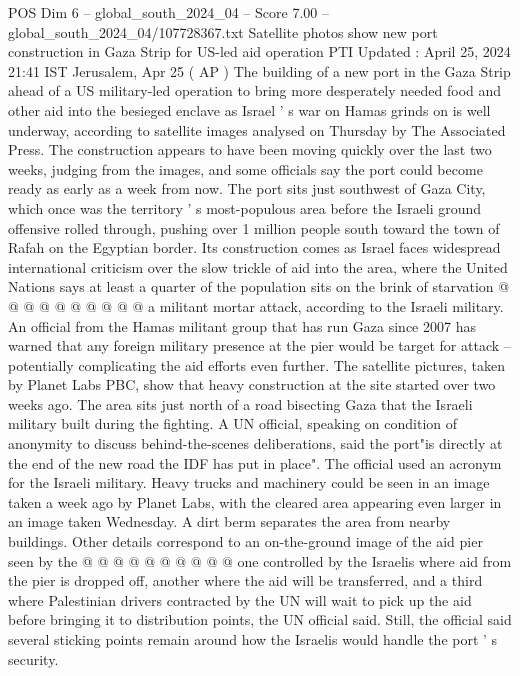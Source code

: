 \begin{textsample}{POS Dim 6 – global\_south\_2024\_04 – Score 7.00 – global\_south\_2024\_04/107728367.txt}  \label{ex:f6_pos_126}
Satellite photos show new port construction in Gaza Strip for US-led aid operation PTI Updated : April 25, 2024 21:41 IST Jerusalem, Apr 25 ( AP ) The building of a new port in the Gaza Strip ahead of a US military-led operation to bring more desperately needed food and other aid into the besieged enclave as Israel ' s war on Hamas grinds on is well underway, according to satellite images analysed on Thursday by The Associated Press.
The construction appears to have been moving quickly over the last two weeks, judging from the images, and some officials say the port could become ready as early as a week from now.
The port sits just southwest of Gaza City, which once was the territory ' s most-populous area before the Israeli ground offensive rolled through, pushing over 1 million people south toward the town of Rafah on the Egyptian border.
Its construction comes as Israel faces widespread international criticism over the slow trickle of aid into the area, where the United Nations says at least a quarter of the population sits on the brink of starvation @ @ @ @ @ @ @ @ @ @ a militant mortar attack, according to the Israeli military.
An official from the Hamas militant group that has run Gaza since 2007 has warned that any foreign military presence at the pier would be target for attack -- potentially complicating the aid efforts even further.
The satellite pictures, taken by Planet Labs PBC, show that heavy construction at the site started over two weeks ago.
The area sits just north of a road bisecting Gaza that the Israeli military built during the fighting.
A UN official, speaking on condition of anonymity to discuss behind-the-scenes deliberations, said the port"is directly at the end of the new road the IDF has put in place".
The official used an acronym for the Israeli military.
Heavy trucks and machinery could be seen in an image taken a week ago by Planet Labs, with the cleared area appearing even larger in an image taken Wednesday.
A dirt berm separates the area from nearby buildings.
Other details correspond to an on-the-ground image of the aid pier seen by the @ @ @ @ @ @ @ @ @ @ one controlled by the Israelis where aid from the pier is dropped off, another where the aid will be transferred, and a third where Palestinian drivers contracted by the UN will wait to pick up the aid before bringing it to distribution points, the UN official said.
Still, the official said several sticking points remain around how the Israelis would handle the port ' s security.

\end{textsample}

